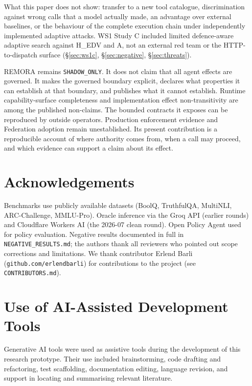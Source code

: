 \documentclass[10pt,twocolumn]{article}
\begin{document}
What this paper does not show: transfer to a new tool catalogue,
discrimination against wrong calls that a model actually made, an advantage
over external baselines, or the behaviour of the complete execution
chain under independently implemented adaptive attacks. WS1 Study C
included limited defence-aware adaptive search against H\_EDV and A,
not an external red team or the HTTP-to-dispatch surface
(\S\ref{sec:ws1c}, \S\ref{sec:negative}, \S\ref{sec:threats}).

REMORA remains \texttt{SHADOW\_ONLY}. It does not claim that all agent
effects are governed. It makes the governed boundary explicit, declares
what properties it can establish at that boundary, and publishes what it
cannot establish. Runtime capability-surface completeness and
implementation effect non-transitivity are among the published
non-claims. The bounded contracts it exposes can be reproduced by
outside operators. Production enforcement evidence and Federation
adoption remain unestablished. Its present contribution is a
reproducible account of where authority comes from, when a call may
proceed, and which evidence can support a claim about its effect.

\section*{Acknowledgements}
Benchmarks use publicly available datasets (BoolQ, TruthfulQA, MultiNLI,
ARC-Challenge, MMLU-Pro). Oracle inference via the Groq API (earlier
rounds) and Cloudflare Workers AI (the 2026-07 clean round). Open Policy
Agent used for policy evaluation. Negative results documented in full in
\texttt{NEGATIVE\_RESULTS.md}; the authors thank all reviewers who pointed
out scope corrections and limitations. We thank contributor Erlend Barli
(\texttt{github.com/erlendbarli}) for contributions to the project
(see \texttt{CONTRIBUTORS.md}).

\section*{Use of AI-Assisted Development Tools}
Generative AI tools were used as assistive tools during the development of
this research prototype. Their use included brainstorming, code drafting
and refactoring, test scaffolding, documentation editing, language
revision, and support in locating and summarising relevant literature.
\end{document}
